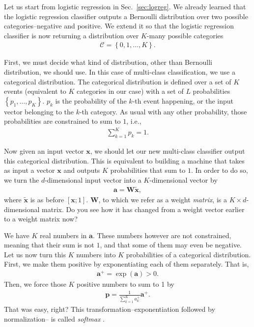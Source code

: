 \documentclass{report}
\newcommand{\vect}[1]{\mathbf{#1}}
\newcommand{\matr}[1]{\mathbf{#1}}
\newcommand{\va}[0]{\vect{a}}
\newcommand{\vx}[0]{\vect{x}}
\newcommand{\vp}[0]{\vect{p}}
\newcommand{\mW}[0]{\matr{W}}
\begin{document}
Let us start from logistic regression in Sec.~\ref{sec:logreg}. We already
learned that the logistic regression classifier outputs a Bernoulli distribution
over two possible categories--negative and positive. We extend it so that the
logistic regression classifier is now returning a distribution over $K$-many
possible categories 
\begin{align}
    \label{eq:catset}
    \mathcal{C} = \left\{ 0, 1, \ldots, K \right\}.
\end{align}

First, we must decide what kind of distribution, other than Bernoulli
distribution, we should use. In this case of multi-class classification, we use
a categorical distribution. The categorical distribution is defined over a set
of $K$ events (equivalent to $K$ categories in our case) with a set of $L$
probabilities $\left\{ p_1, \ldots, p_K \right\}$. $p_k$ is the probability of
the $k$-th event happening, or the input vector belonging to the $k$-th
category. As usual with any other probability, those probabilities are
constrained to sum to $1$, i.e.,
\begin{align*}
    \sum_{k=1}^K p_k = 1.
\end{align*}

Now given an input vector $\vx$, we should let our new multi-class classifier
output this categorical distribution. This is equivalent to building a machine
that takes as input a vector $\vx$ and outputs $K$ probabilities that sum to
$1$. In order to do so, we turn the $d$-dimensional input vector
into a $K$-dimensional vector by
\begin{align*}
    \va = \mW \tilde{\vx},
\end{align*}
where $\tilde{\vx}$ is as before $\left[ \vx; 1 \right]$. $\mW$, to which we
refer as a weight {\it matrix}, is a $K \times d$-dimensional matrix. Do you see
how it has changed from a weight vector earlier to a weight matrix now?

We have $K$ real numbers in $\va$. These numbers however are not constrained,
meaning that their sum is not $1$, and that some of them may even be negative.
Let us now turn this $K$ numbers into $K$ probabilities of a categorical
distribution. First, we make them positive by exponentiating each of them
separately. That is,
\begin{align*}
    \va^+ = \exp(\va) > 0.
\end{align*}
Then, we force those $K$ positive numbers to sum to 1 by
\begin{align}
    \label{eq:multlog_out}
    \vp = \frac{1}{\sum_{k=1}^K a^+_k} \va^+.
\end{align}
That was easy, right? This transformation--exponentiation followed by
normalization-- is called {\it softmax} \cite{Bridle1990}. 
\end{document}
